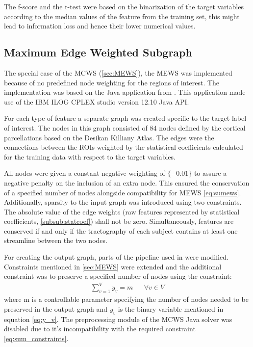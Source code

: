 \documentclass[msthesis.tex]{subfiles}
\begin{document}
The f-score and the t-test were based on the binarization of the target variables according to the median values of the feature from the training set, this might lead to information loss and hence their lower numerical values. 
\fi

\subsection{Maximum Edge Weighted Subgraph}
\label{method:MEWS}

The special case of the MCWS (\autoref{sec:MEWS}), the MEWS was implemented because of no predefined node weighting for the regions of interest. The implementation was based on  the Java application from \cite{DBLP:journals/corr/LobodaAS16}. This application made use of the IBM ILOG CPLEX studio version 12.10 Java API. 

For each type of feature a separate graph was created specific to the target label of interest. The nodes in this graph consisted of 84 nodes defined by the cortical parcellations based on the Desikan Killiany Atlas. The edges were the connections between the ROIs weighted by the statistical coefficients calculated for the training data with respect to the target variables.

All nodes were given a constant negative weighting of $\{-0.01\}$ to assure a negative penalty on the inclusion of an extra node. This ensured the conservation of a specified number of nodes alongside compatibility for MEWS  \autoref{eq:sumews}. Additionally, sparsity to the input graph was introduced using two constraints. The absolute value of the edge weights (raw features represented by statistical coefficients, \autoref{subsub:statcoef}) shall not be zero. Simultaneously, features are conserved if and only if the tractography of each subject contains at least one streamline between the two nodes. 

For creating the output graph, parts of the pipeline used in \cite{DBLP:journals/corr/LobodaAS16} were modified. Constraints mentioned in \autoref{sec:MEWS} were extended and the additional constraint was to preserve a specified number of nodes using the constraint:
\begin{align}
    \label{eq:sum_constraints}
    \sum_{v=1}^{V} y_v = m        &&  \forall v \in V
\end{align}
where m is a controllable parameter specifying the number of nodes needed to be preserved in the output graph and $y_v$ is the binary variable mentioned in equation \autoref{eq:y_v}. The preprocessing module of the MCWS Java solver was disabled due to it's incompatibility with the required constraint \autoref{eq:sum_constraints}.
\end{document}
